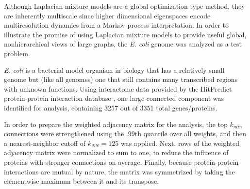 \documentclass[10pt,letterpaper]{article}
\begin{document}
Although Laplacian mixture models are a global optimization type method, they are inherently multiscale since higher dimensional eigenspaces encode multiresolution dynamics from a Markov process interpretation.
In order to illustrate the promise of using Laplacian mixture models to provide useful global, nonhierarchical views of large graphs, the \emph{E. coli} genome was analyzed as a test problem.

\emph{E. coli} is a bacterial model organism in biology that has a relatively small genome but (like all genomes) one that still contains many transcribed regions with unknown functions.
Using interactome data provided by the HitPredict protein-protein interaction database \cite{hitpredict}, one large connected component was identified for analysis, containing 3257 out of 3351 total genes/proteins.

In order to prepare the weighted adjacency matrix for the analysis, the top $k_{min}$ connections were strengthened using the .99th quantile over all weights, and then a nearest-neighbor cutoff of $k_{NN}=125$ was applied.
Next, rows of the weighted adjacency matrix were normalized to sum to one, to reduce the influence of proteins with stronger connections on average.
Finally, because protein-protein interactions are mutual by nature, the matrix was symmetrized by taking the elementwise maximum between it and its transpose.
\end{document}
